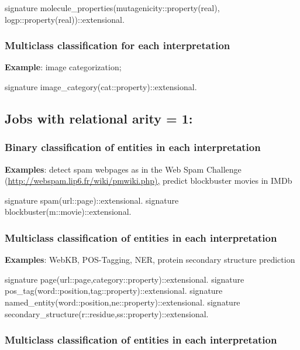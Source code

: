 \begin{code}
signature
  molecule_properties(mutagenicity::property(real),
                     logp::property(real))::extensional.
\end{code}

\subsubsection{Multiclass classification for each interpretation}

\textbf{Example}: image categorization;

\begin{code}
signature image_category(cat::property)::extensional.
\end{code}

\subsection{Jobs with relational arity = 1:}

\subsubsection{Binary classification of entities in each interpretation}

\textbf{Examples}: detect spam webpages as in the Web Spam Challenge
(\url{http://webspam.lip6.fr/wiki/pmwiki.php),} predict blockbuster
movies in IMDb

\begin{code}
signature spam(url::page)::extensional.
signature blockbuster(m::movie)::extensional.
\end{code}

\subsubsection{Multiclass classification of entities in each interpretation}

\textbf{Examples}: WebKB, POS-Tagging, NER, protein secondary structure prediction

\begin{code}
signature page(url::page,category::property)::extensional.
signature pos_tag(word::position,tag::property)::extensional.
signature named_entity(word::position,ne::property)::extensional.
signature secondary_structure(r::residue,ss::property)::extensional.
\end{code}

\subsubsection{Multiclass classification of entities in each interpretation}

